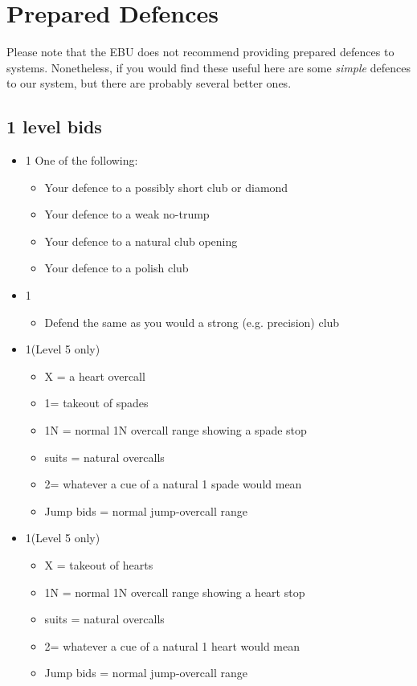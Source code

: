 \section{Prepared Defences}
\label{appx:defences}

Please note that the EBU does not recommend providing prepared defences to
systems.  Nonetheless, if you would find these useful here are some {\em simple}
defences to our system, but there are probably several better ones.

\subsection{1 level bids}

\begin{itemize}
\item 1\clubs
	One of the following:
	\begin{itemize}
	\item Your defence to a possibly short club or diamond
	\item Your defence to a weak no-trump
	\item Your defence to a natural club opening 
	\item Your defence to a polish club
	\end{itemize}
\item 1\diamonds
	\begin{itemize}
	\item Defend the same as you would a strong (e.g. precision) club
	\end{itemize}
\item 1\hearts (Level 5 only)
	\begin{itemize}
	\item X = a heart overcall
	\item 1\spades = takeout of spades
	\item 1N = normal 1N overcall range showing a spade stop
	\item suits = natural overcalls
	\item 2\spades = whatever a cue of a natural 1 spade would mean 
	\item Jump bids = normal jump-overcall range
	\end{itemize}
\item 1\spades (Level 5 only)
	\begin{itemize}
	\item X = takeout of hearts
	\item 1N = normal 1N overcall range showing a heart stop
	\item suits = natural overcalls
	\item 2\hearts = whatever a cue of a natural 1 heart would mean 
	\item Jump bids = normal jump-overcall range
	\end{itemize}
\end{itemize}

